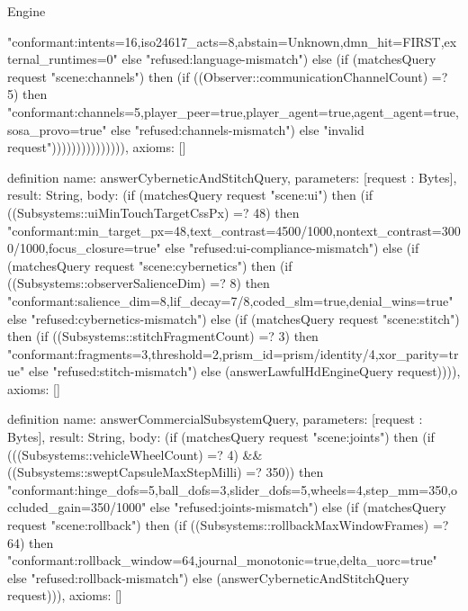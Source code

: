\begin{lexlean}{Engine}
\begin{semanticmodule}
{"conformant:intents=16,iso24617_acts=8,abstain=Unknown,dmn_hit=FIRST,external_runtimes=0" else "refused:language-mismatch") else (if (matchesQuery request "scene:channels") then (if ((Observer::communicationChannelCount) =? 5) then "conformant:channels=5,player_peer=true,player_agent=true,agent_agent=true,sosa_provo=true" else "refused:channels-mismatch") else "invalid request"))))))))))))))),
  axioms: []
}

definition{
  name: answerCyberneticAndStitchQuery,
  parameters: [request : Bytes],
  result: String,
  body: (if (matchesQuery request "scene:ui") then (if ((Subsystems::uiMinTouchTargetCssPx) =? 48) then "conformant:min_target_px=48,text_contrast=4500/1000,nontext_contrast=3000/1000,focus_closure=true" else "refused:ui-compliance-mismatch") else (if (matchesQuery request "scene:cybernetics") then (if ((Subsystems::observerSalienceDim) =? 8) then "conformant:salience_dim=8,lif_decay=7/8,coded_slm=true,denial_wins=true" else "refused:cybernetics-mismatch") else (if (matchesQuery request "scene:stitch") then (if ((Subsystems::stitchFragmentCount) =? 3) then "conformant:fragments=3,threshold=2,prism_id=prism/identity/4,xor_parity=true" else "refused:stitch-mismatch") else (answerLawfulHdEngineQuery request)))),
  axioms: []
}

definition{
  name: answerCommercialSubsystemQuery,
  parameters: [request : Bytes],
  result: String,
  body: (if (matchesQuery request "scene:joints") then (if (((Subsystems::vehicleWheelCount) =? 4) && ((Subsystems::sweptCapsuleMaxStepMilli) =? 350)) then "conformant:hinge_dofs=5,ball_dofs=3,slider_dofs=5,wheels=4,step_mm=350,occluded_gain=350/1000" else "refused:joints-mismatch") else (if (matchesQuery request "scene:rollback") then (if ((Subsystems::rollbackMaxWindowFrames) =? 64) then "conformant:rollback_window=64,journal_monotonic=true,delta_uorc=true" else "refused:rollback-mismatch") else (answerCyberneticAndStitchQuery request))),
  axioms: []
}


\end{semanticmodule}
\end{lexlean}
